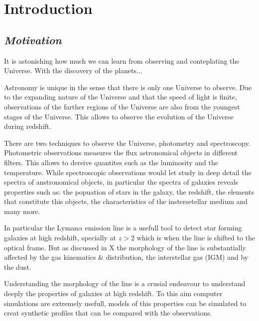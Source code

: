 
\chapter{Introduction} %

\label{sec:intro} %


\section{\emph{Motivation}}

It is astonishing how much we can learn from observing and 
conteplating the Universe. With the discovery of the planets...

Astronomy is unique in the sense that there is only one Universe 
to observe. Due to the expanding nature of the Universe and 
that the speed of light is finite, observations of the farther 
regions of the Universe are also from the youngest stages of the Universe.
This allows to observe the evolution of the Universe during redshift.

There are two techniques to observe the Universe, photometry and spectroscopy.  
Photometric observations measures the flux astronomical objects in different filters. This allows to dereive quantites such as the luminosity and the temperature. While spectroscopic observations would let study in deep detail
the spectra of anstronomical objects, in particular the spectra of 
galaxies reveals properties such as: the popuation of stars in the galaxy, the
redshift, the elements that constitute this objects, the characteristics 
of the instersetellar medium and many more.

In particular the Lyman$\alpha$ emission line is a usefull 
tool to detect star forming galaxies at high redshift, specially 
at $z>2$ which is when the line is shifted to the optical frame. But 
as discussed in X the morphology of the line is substantially affected
by the gas kinematics \& distribution, the interstellar gas (IGM)
 and by the dust. 

Understanding the morphology of the \ly line is a crusial endeavour 
to understand deeply the properties of galaxies at high redshift. To this aim 
computer simulations are extremely usefull, models of this properties 
can be simulated to creat synthetic profiles that can be compared
with the observations. 


